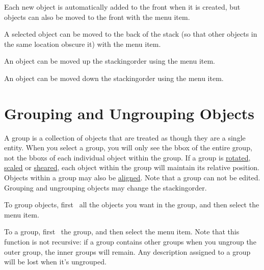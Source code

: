 
Each new \gls{object} is automatically added to the \gls{front} when it is
created, but \glspl{object} can also be moved to the \gls{front} 
with the  menu item.


A selected \gls{object} can be moved to the
\gls{back} of the \gls{stack} (so that other \glspl{object} in the
same location obscure it) with the  menu item.


An object can be moved up the \gls{stackingorder} using
the  menu item.


An object can be moved down the \gls{stackingorder} using
the  menu item.


\section{Grouping and Ungrouping Objects}\label{sec:grouping}

A \gls{group} is a collection of \glspl{object} that are treated as
though they are a single entity. When you select a \gls{group}, you
will only see the \gls{bbox} of the entire group, not the
\glspl*{bbox} of each individual object within the group. If a
\gls{group} is \hyperref[sec:rotateobjects]{rotated},
\hyperref[sec:scaleobjects]{scaled} or \hyperref[sec:shearobjects]{sheared}, each
\gls*{object} within the group will maintain its relative position.
Objects within a \gls{group} may also be
\hyperref[sec:alignobjects]{aligned}.  Note that a \gls{group} can
not be edited. Grouping and ungrouping \glspl*{object} may change
the \gls{stackingorder}.


To group \glspl*{object}, first \select\
all the objects you want in the \gls{group}, and then select the
\menu{transform.group} menu item.


To  a group, first \select\ the
group, and then select the  menu item. Note
that this function is not recursive: if a group contains other
groups when you ungroup the outer group, the inner groups will
remain.  Any description assigned to a group will be lost when it's
ungrouped.

